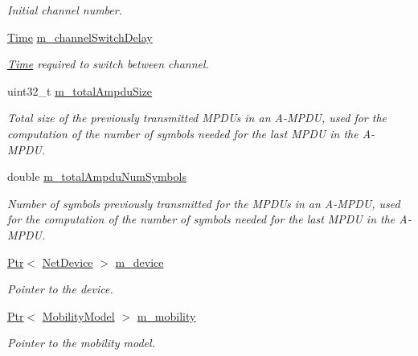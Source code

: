 \begin{DoxyCompactItemize}
\begin{DoxyCompactList}\small\item\em Initial channel number. \end{DoxyCompactList}\item 
\hyperlink{classns3_1_1Time}{Time} \hyperlink{classns3_1_1WifiPhy_a138b7bdd10dd952ebab47eb7c8e1ad11}{m\+\_\+channel\+Switch\+Delay}
\begin{DoxyCompactList}\small\item\em \hyperlink{classns3_1_1Time}{Time} required to switch between channel. \end{DoxyCompactList}\item 
uint32\+\_\+t \hyperlink{classns3_1_1WifiPhy_a33881bc9adbd2f0fa397fa6d5a44365f}{m\+\_\+total\+Ampdu\+Size}
\begin{DoxyCompactList}\small\item\em Total size of the previously transmitted M\+P\+D\+Us in an A-\/\+M\+P\+DU, used for the computation of the number of symbols needed for the last M\+P\+DU in the A-\/\+M\+P\+DU. \end{DoxyCompactList}\item 
double \hyperlink{classns3_1_1WifiPhy_aef81821222be314fe60d1b1827b1397f}{m\+\_\+total\+Ampdu\+Num\+Symbols}
\begin{DoxyCompactList}\small\item\em Number of symbols previously transmitted for the M\+P\+D\+Us in an A-\/\+M\+P\+DU, used for the computation of the number of symbols needed for the last M\+P\+DU in the A-\/\+M\+P\+DU. \end{DoxyCompactList}\item 
\hyperlink{classns3_1_1Ptr}{Ptr}$<$ \hyperlink{classns3_1_1NetDevice}{Net\+Device} $>$ \hyperlink{classns3_1_1WifiPhy_a4af13f5ca1cceee58ec53b2172f39a43}{m\+\_\+device}
\begin{DoxyCompactList}\small\item\em Pointer to the device. \end{DoxyCompactList}\item 
\hyperlink{classns3_1_1Ptr}{Ptr}$<$ \hyperlink{classns3_1_1MobilityModel}{Mobility\+Model} $>$ \hyperlink{classns3_1_1WifiPhy_a06d54d4a848b9cd20262b12cb5f68d58}{m\+\_\+mobility}
\begin{DoxyCompactList}\small\item\em Pointer to the mobility model. \end{DoxyCompactList}\end{DoxyCompactItemize}
